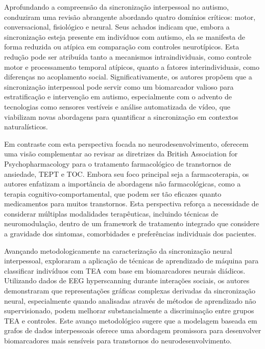 Aprofundando a compreensão da sincronização interpessoal no autismo,  conduziram uma revisão abrangente abordando quatro domínios críticos: motor, conversacional, fisiológico e neural. Seus achados indicam que, embora a sincronização esteja presente em indivíduos com autismo, ela se manifesta de forma reduzida ou atípica em comparação com controles neurotípicos. Esta redução pode ser atribuída tanto a mecanismos intraindividuais, como controle motor e processamento temporal atípicos, quanto a fatores interindividuais, como diferenças no acoplamento social. Significativamente, os autores propõem que a sincronização interpessoal pode servir como um biomarcador valioso para estratificação e intervenção em autismo, especialmente com o advento de tecnologias como sensores vestíveis e análise automatizada de vídeo, que viabilizam novas abordagens para quantificar a sincronização em contextos naturalísticos.

Em contraste com esta perspectiva focada no neurodesenvolvimento,  oferecem uma visão complementar ao revisar as diretrizes da British Association for Psychopharmacology para o tratamento farmacológico de transtornos de ansiedade, TEPT e TOC. Embora seu foco principal seja a farmacoterapia, os autores enfatizam a importância de abordagens não farmacológicas, como a terapia cognitivo-comportamental, que podem ser tão eficazes quanto medicamentos para muitos transtornos. Esta perspectiva reforça a necessidade de considerar múltiplas modalidades terapêuticas, incluindo técnicas de neuromodulação, dentro de um framework de tratamento integrado que considere a gravidade dos sintomas, comorbidades e preferências individuais dos pacientes.

Avançando metodologicamente na caracterização da sincronização neural interpessoal,  exploraram a aplicação de técnicas de aprendizado de máquina para classificar indivíduos com TEA com base em biomarcadores neurais diádicos. Utilizando dados de EEG hyperscanning durante interações sociais, os autores demonstraram que representações gráficas complexas derivadas da sincronização neural, especialmente quando analisadas através de métodos de aprendizado não supervisionado, podem melhorar substancialmente a discriminação entre grupos TEA e controles. Este avanço metodológico sugere que a modelagem baseada em grafos de dados interpessoais oferece uma abordagem promissora para desenvolver biomarcadores mais sensíveis para transtornos do neurodesenvolvimento.

